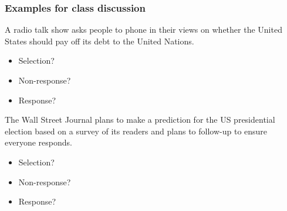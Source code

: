 \documentclass[
]{report}
\providecommand{\tightlist}{%
  \setlength{\itemsep}{0pt}\setlength{\parskip}{0pt}}
\begin{document}

\hypertarget{examples-for-class-discussion}{%
\subsubsection*{Examples for class discussion}\label{examples-for-class-discussion}}

A radio talk show asks people to phone in their views on whether the United States should pay off its debt to the United Nations.

\begin{itemize}
\tightlist
\item
  Selection?
\end{itemize}

\vspace{0.25in}

\begin{itemize}
\tightlist
\item
  Non-response?
\end{itemize}

\vspace{0.25in}

\begin{itemize}
\tightlist
\item
  Response?
\end{itemize}

\vspace{0.25in}

The Wall Street Journal plans to make a prediction for the US presidential election based on a survey of its readers and plans to follow-up to ensure everyone responds.

\begin{itemize}
\tightlist
\item
  Selection?
\end{itemize}

\vspace{0.25in}

\begin{itemize}
\tightlist
\item
  Non-response?
\end{itemize}

\vspace{0.25in}

\begin{itemize}
\tightlist
\item
  Response?
\end{itemize}
\end{document}
